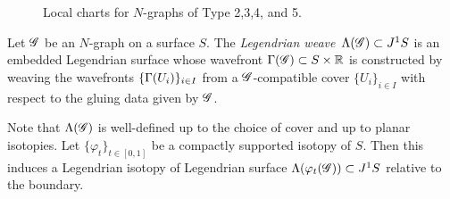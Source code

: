 \begin{figure}[ht]
\caption{Local charts for $N$-graphs of Type 2,3,4, and 5.}
\label{fig:local_chart_3-graphs}
\end{figure}

\begin{definition}\cite[Definition~2.7]{CZ2020}
Let $\mathscr{G}$ be an $N$-graph on a surface $S$. 
The {\em Legendrian weave}~$\Lambda(\mathscr{G})\subset J^1 S$ is an embedded Legendrian surface whose wavefront $\Gamma(\mathscr{G})\subset S\times \mathbb{R}$ is constructed by weaving the wavefronts $\{\Gamma(U_i)\}_{i\in I}$ from a $\mathscr{G}$-compatible cover $\{U_i\}_{i\in I}$ with respect to the gluing data given by $\mathscr{G}$.
\end{definition}

\begin{remark}
Note that $\Lambda(\mathscr{G})$ is well-defined up to the choice of cover and up to planar isotopies.
Let $\{\varphi_t\}_{t\in[0,1]}$ be a compactly supported isotopy of $S$.
Then this induces a Legendrian isotopy of Legendrian surface $\Lambda(\varphi_t(\mathscr{G}))\subset J^1 S$ relative to the boundary.
\end{remark}

